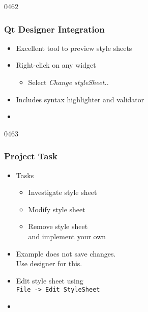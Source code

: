 \begin{slide}{0462}\frametitle{Qt Designer Integration}
\begin{itemize}
\item Excellent tool to preview style sheets
\item Right-click on any widget
  \begin{itemize}
  \item Select \textit{Change styleSheet..}
  \end{itemize}
\item Includes syntax highlighter and validator
\item[] 
\end{itemize}
\end{slide}

\begin{slide}{0463}\frametitle{Project Task}
\begin{itemize}
\item Tasks
  \begin{itemize}
  \item Investigate style sheet
  \item Modify style sheet
  \item Remove style sheet \\ and implement your own
 \end{itemize}
\item Example does not save changes. \\ Use designer for this.
\item Edit style sheet using \\ \texttt{File -> Edit StyleSheet}
\item[] 
\end{itemize}
\end{slide}
